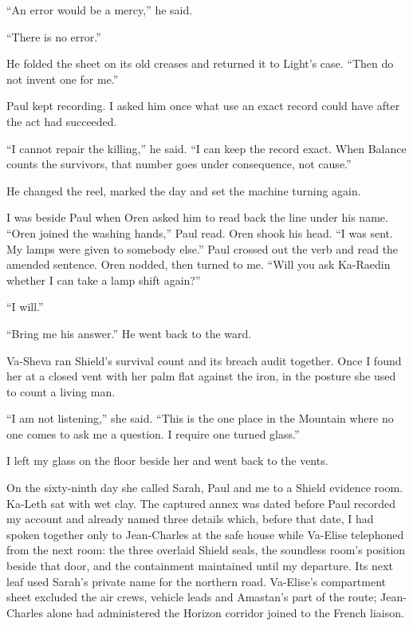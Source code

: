 ``An error would be a mercy,'' he said.\par

``There is no error.''\par

He folded the sheet on its old creases and returned it to Light's case. ``Then do not invent one for me.''\par

Paul kept recording. I asked him once what use an exact record could have after the act had succeeded.\par

``I cannot repair the killing,'' he said. ``I can keep the record exact. When Balance counts the survivors, that number goes under consequence, not cause.''\par

He changed the reel, marked the day and set the machine turning again.\par

I was beside Paul when Oren asked him to read back the line under his name. ``Oren joined the washing hands,'' Paul read. Oren shook his head. ``I was sent. My lamps were given to somebody else.'' Paul crossed out the verb and read the amended sentence. Oren nodded, then turned to me. ``Will you ask Ka-Raedin whether I can take a lamp shift again?''\par

``I will.''\par

``Bring me his answer.'' He went back to the ward.\par

Va-Sheva ran Shield's survival count and its breach audit together. Once I found her at a closed vent with her palm flat against the iron, in the posture she used to count a living man.\par

``I am not listening,'' she said. ``This is the one place in the Mountain where no one comes to ask me a question. I require one turned glass.''\par

I left my glass on the floor beside her and went back to the vents.\par

\ornament

On the sixty-ninth day she called Sarah, Paul and me to a Shield evidence room. Ka-Leth sat with wet clay. The captured annex was dated before Paul recorded my account and already named three details which, before that date, I had spoken together only to Jean-Charles at the safe house while Va-Elise telephoned from the next room: the three overlaid Shield seals, the soundless room's position beside that door, and the containment maintained until my departure. Its next leaf used Sarah's private name for the northern road. Va-Elise's compartment sheet excluded the air crews, vehicle leads and Amastan's part of the route; Jean-Charles alone had administered the Horizon corridor joined to the French liaison.\par

